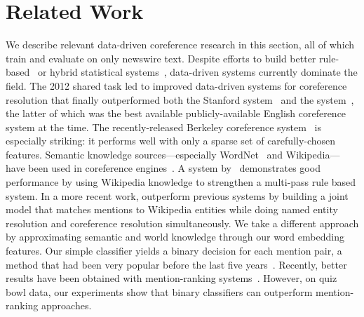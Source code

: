 
\section{Related Work}
\label{sec:related}

We describe relevant data-driven coreference
research in this section, all of which train and evaluate on only newswire text.  Despite efforts to build better rule-based~\cite{luo2004mention} or
hybrid statistical systems~\cite{haghighi2010coreference}, data-driven systems currently
dominate the field. The 2012 \conll{} shared task led to improved data-driven
systems for coreference resolution that finally outperformed both the Stanford
system~\cite{lee2011stanford} and the  system~\cite{bjorkelund2012data},
the latter of which was the best available publicly-available English coreference
system at the time. The recently-released
Berkeley coreference system~\cite{DurrettKlein2013} is especially striking: it performs well with only a sparse set of carefully-chosen features.
Semantic knowledge sources---especially WordNet~\cite{miller1995wordnet} and
Wikipedia---have been used in coreference
engines~\cite{ponzetto2006exploiting}. A system by~ demonstrates good performance by using Wikipedia knowledge to strengthen a
multi-pass rule based system. In a more recent work,
 outperform previous systems by building a joint model that matches mentions to Wikipedia entities while doing named entity resolution and
coreference resolution simultaneously. We take a different approach by approximating semantic and world knowledge through our word embedding features.
Our simple classifier yields a binary decision for each mention pair, a method that had been very popular before the last five years~\cite{soon2001machine,bengtson2008understanding,stoyanov2010coreference}. Recently, better results have been obtained with mention-ranking systems~\cite{luo2004mention,haghighi2010coreference,DurrettKlein2013,bjorkelund2014learning}. However, on quiz bowl data, our experiments show that binary classifiers can outperform mention-ranking approaches.